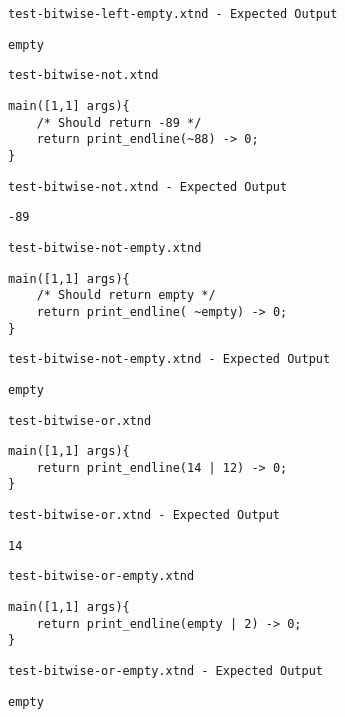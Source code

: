 \medskip \noindent \texttt{test-bitwise-left-empty.xtnd - Expected Output}


\begin{lstlisting}
empty
\end{lstlisting}


\medskip \noindent \texttt{test-bitwise-not.xtnd}


\begin{lstlisting}
main([1,1] args){
	/* Should return -89 */
	return print_endline(~88) -> 0;
}
\end{lstlisting}


\medskip \noindent \texttt{test-bitwise-not.xtnd - Expected Output}


\begin{lstlisting}
-89
\end{lstlisting}


\medskip \noindent \texttt{test-bitwise-not-empty.xtnd}


\begin{lstlisting}
main([1,1] args){
	/* Should return empty */
	return print_endline( ~empty) -> 0;
}
\end{lstlisting}


\medskip \noindent \texttt{test-bitwise-not-empty.xtnd - Expected Output}


\begin{lstlisting}
empty
\end{lstlisting}


\medskip \noindent \texttt{test-bitwise-or.xtnd}


\begin{lstlisting}
main([1,1] args){
	return print_endline(14 | 12) -> 0;
}
\end{lstlisting}


\medskip \noindent \texttt{test-bitwise-or.xtnd - Expected Output}


\begin{lstlisting}
14
\end{lstlisting}


\medskip \noindent \texttt{test-bitwise-or-empty.xtnd}


\begin{lstlisting}
main([1,1] args){
	return print_endline(empty | 2) -> 0;
}
\end{lstlisting}


\medskip \noindent \texttt{test-bitwise-or-empty.xtnd - Expected Output}


\begin{lstlisting}
empty
\end{lstlisting}


